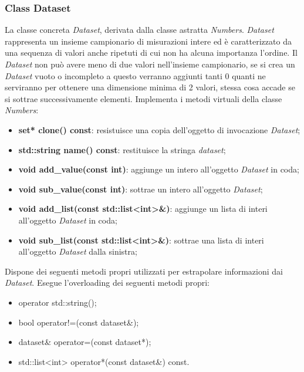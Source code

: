 \documentclass[a4paper,10pt]{article}
\begin{document}
    \subsubsection{Class Dataset}
    La classe concreta \textit{Dataset}, derivata dalla classe astratta \textit{Numbers}. \textit{Dataset} rappresenta un insieme campionario di misurazioni intere ed è caratterizzato da una sequenza di valori anche ripetuti di cui non ha alcuna importanza l’ordine. Il \textit{Dataset} non può avere meno di due valori nell’insieme campionario, se si crea un \textit{Dataset} vuoto o incompleto a questo verranno aggiunti tanti 0 quanti ne serviranno per ottenere una dimensione minima di 2 valori, stessa cosa accade se si sottrae successivamente elementi.
    Implementa i metodi virtuali della classe \textit{Numbers}:
	\begin{itemize}
        \item \textbf{set* clone() const}: resistuisce una copia dell'oggetto di invocazione \textit{Dataset};
		\item \textbf{std::string name() const}: restituisce la stringa \textit{dataset};
        \item \textbf{void add\_value(const int)}: aggiunge un intero all'oggetto \textit{Dataset} in coda;
		\item \textbf{void sub\_value(const int)}: sottrae un intero all'oggetto \textit{Dataset};
		\item \textbf{void add\_list(const std::list<int>\&)}: aggiunge un lista di interi all'oggetto \textit{Dataset} in coda;
        \item \textbf{void sub\_list(const std::list<int>\&)}: sottrae una lista di interi all'oggetto \textit{Dataset} dalla sinistra;
    \end{itemize}
    Dispone dei seguenti metodi propri utilizzati per estrapolare informazioni dai \textit{Dataset}.
    Esegue l'overloading dei seguenti metodi propri:
    \begin{itemize}
        \item operator std::string();
        \item bool operator!=(const dataset\&);
        \item dataset\& operator=(const dataset*);
        \item std::list<int> operator*(const dataset\&) const.
    \end{itemize}
\end{document}

